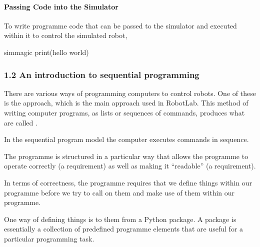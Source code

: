 \documentclass[letterpaper,10pt,english]{sphinxmanual}
\begin{document}
\paragraph{Passing Code into the Simulator}
\label{\detokenize{content/01_Robot_Lab/Section_00_01:Passing-Code-into-the-Simulator}}
To write programme code that can be passed to the simulator and executed within it to control the simulated robot,

{
\begin{sphinxVerbatim}[commandchars=\\\{\}]
\llap{\color{nbsphinxin}[ ]:\,\hspace{\fboxrule}\hspace{\fboxsep}}\PYGZpc{}\PYGZpc{}sim\PYGZus{}magic
print(\PYGZsq{}hello world\PYGZsq{})
\end{sphinxVerbatim}
}


\subsubsection{1.2 An introduction to sequential programming}
\label{\detokenize{content/01_Robot_Lab/Section_00_01:1.2-An-introduction-to-sequential-programming}}
There are various ways of programming computers to control robots. One of these is the  approach, which is the main approach used in RobotLab. This method of writing computer programs, as lists or sequences of commands, produces what are called .

In the sequential program model the computer executes commands in sequence.


The programme is structured in a particular way that allows the programme to operate correctly (a  requirement) as well as making it “readable” (a  requirement).

In terms of correctness, the programme requires that we define things within our programme before we try to call on them and make use of them within our programme.

One way of defining things is to  them from a Python package. A package is essentially a collection of predefined programme elements that are useful for a particular programming task.
\end{document}
